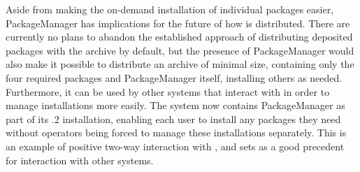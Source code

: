 Aside from making the on-demand installation of individual packages easier, {\sf
  PackageManager} has implications for the future of how \GAP is distributed.
There are currently no plans to abandon the established approach of distributing
deposited packages with the \GAP archive by default, but the presence of {\sf
  PackageManager} would also make it possible to distribute an archive of
minimal size, containing only the four required packages and {\sf
  PackageManager} itself, installing others as needed.  Furthermore, it
can be used by other systems that interact with \GAP in order to manage
installations more easily.  The \cocalc system now contains {\sf PackageManager}
as part of its .2 installation, enabling each user to install any
packages they need without \cocalc operators being forced to manage these
installations separately.  This is an example of positive two-way interaction
with \cocalc, and sets as a good precedent for interaction with other
systems.

